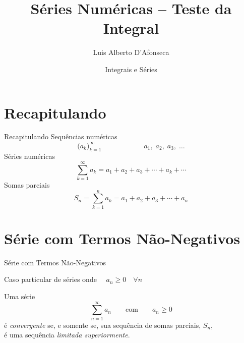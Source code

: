 
\usepackage{apresentacao}
\usepackage{mathconfig}
\usepackage{tabto}

\makeatletter
\graphicspath  {{./figs/}}
\makeatother

\title {Séries Numéricas -- Teste da Integral}
\author{\large Luis Alberto D'Afonseca}
\date  {Integrais e Séries}



\begin{frame}
  \titlepage
\end{frame}

\section{Recapitulando}

\begin{frame}{Recapitulando}
  Sequências numéricas
  \[
    \big( a_k \big)_{k=1}^\infty \qquad\qquad\qquad a_1,\; a_2,\; a_3,\; \dots
  \]
  \pause
  Séries numéricas
  \[
    \sum_{k=1}^\infty a_k = a_1 + a_2 + a_3 + \cdots + a_k + \cdots
  \]
  \pause
  Somas parciais
  \[
    S_n = \sum_{k=1}^n a_k = a_1 + a_2 + a_3 + \cdots + a_n
  \]
\end{frame}

\section{Série com Termos Não-Negativos}

\begin{frame}{Série com Termos Não-Negativos}

Caso particular de séries onde $\quad a_n \geq 0 \quad \forall n$

\pause
\vspace{\baselineskip}
Uma série
\[\sum_{n=1}^\infty a_n \qquad \text{com} \qquad a_n\geq 0 \]
é \emph{convergente} se, e somente se, sua sequência de somas parciais, $S_n$, \\
é uma sequência \emph{limitada superiormente}.
\end{frame}

